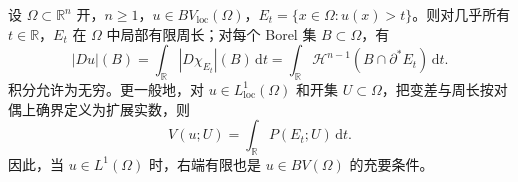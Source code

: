 \begin{theorem}[BV 余面积公式]\label{g3:thm:bv-coarea}
	设 \(\Omega\subset\mathbb R^n\) 开，\(n\ge1\)，\(u\in BV_{\mathrm{loc}}(\Omega)\)，\(E_t=\{x\in\Omega:u(x)>t\}\)。则对几乎所有 \(t\in\mathbb R\)，\(E_t\) 在 \(\Omega\) 中局部有限周长；对每个 Borel 集 \(B\subset\Omega\)，有
	\begin{equation}\label{g3:eq:bv-coarea-measure}
		|Du|(B)=\int_{\mathbb R}|D\chi_{E_t}|(B)\,\mathrm dt
		=\int_{\mathbb R}\mathcal H^{n-1}(B\cap\partial^*E_t)\,\mathrm dt.
	\end{equation}
	积分允许为无穷。更一般地，对 \(u\in L^1_{\mathrm{loc}}(\Omega)\) 和开集 \(U\subset\Omega\)，把变差与周长按对偶上确界定义为扩展实数，则
	\begin{equation}\label{g3:eq:bv-coarea-open}
		V(u;U)=\int_{\mathbb R}P(E_t;U)\,\mathrm dt.
	\end{equation}
	因此，当 \(u\in L^1(\Omega)\) 时，右端有限也是 \(u\in BV(\Omega)\) 的充要条件。
\end{theorem}
